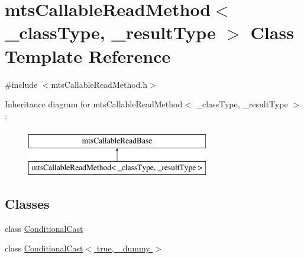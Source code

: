 \hypertarget{classmts_callable_read_method}{\section{mts\-Callable\-Read\-Method$<$ \-\_\-class\-Type, \-\_\-result\-Type $>$ Class Template Reference}
\label{classmts_callable_read_method}
}


{\ttfamily \#include $<$mts\-Callable\-Read\-Method.\-h$>$}

Inheritance diagram for mts\-Callable\-Read\-Method$<$ \-\_\-class\-Type, \-\_\-result\-Type $>$\-:\begin{figure}[H]
\begin{center}
\leavevmode
\includegraphics[height=2.000000cm]{d9/d8a/classmts_callable_read_method}
\end{center}
\end{figure}
\subsection*{Classes}
\begin{DoxyCompactItemize}
\item 
class \hyperlink{classmts_callable_read_method_1_1_conditional_cast}{Conditional\-Cast}
\item 
class \hyperlink{classmts_callable_read_method_1_1_conditional_cast_3_01true_00_01__dummy_01_4}{Conditional\-Cast$<$ true, \-\_\-dummy $>$}
\end{DoxyCompactItemize}
